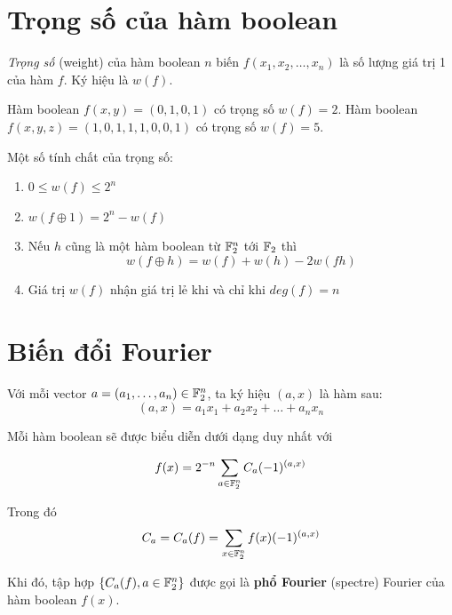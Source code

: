 \section{Trọng số của hàm boolean}

\begin{definition}
    \textit{Trọng số} (weight) của hàm boolean $n$ biến
    $f(x_1, x_2, \ldots, x_n)$ là số lượng giá trị 1 của
    hàm $f$. Ký hiệu là $w(f)$.
\end{definition}

\begin{example}
    Hàm boolean $f(x, y) = (0, 1, 0, 1)$ có trọng số $w(f) = 2$.
    Hàm boolean $f(x, y, z) = (1, 0, 1, 1, 1, 0, 0, 1)$ có
    trọng số $w(f) = 5$.
\end{example}

Một số tính chất của trọng số:

\begin{enumerate}
    \item $0 \leq w(f) \leq 2^n$
    \item $w(f \oplus 1) = 2^n - w(f)$
    \item Nếu $h$ cũng là một hàm boolean từ $\mathbb{F}_2^n$ tới 
        $\mathbb{F}_2$ thì \[w(f \oplus h) = w(f) + w(h) - 2w(fh)\]
    \item Giá trị $w(f)$ nhận giá trị lẻ khi và chỉ khi $deg(f) = n$
\end{enumerate}

\section{Biến đổi Fourier}

Với mỗi vector $a = (a_1, \ldots, a_n) \in \mathbb{F}_2^n$, ta ký
hiệu $(a, x)$ là hàm sau:
\begin{equation}
    (a, x) = a_1 x_1 + a_2 x_2 + \ldots + a_n x_n
\end{equation}

Mỗi hàm boolean sẽ được biểu diễn dưới dạng duy nhất với

\begin{equation}
    f(x) = 2^{-n} \sum_{a \in \mathbb{F}_2^n} C_a (-1)^{(a, x)}
\end{equation}

Trong đó
\begin{equation}
    C_a = C_a (f) = \sum_{x \in \mathbb{F}_2^n} f(x) (-1)^{(a, x)}
\end{equation}

Khi đó, tập hợp $\{C_a (f), a \in \mathbb{F}_2^n \}$ được gọi là 
\textbf{phổ Fourier} (spectre) Fourier của hàm boolean $f(x)$.


